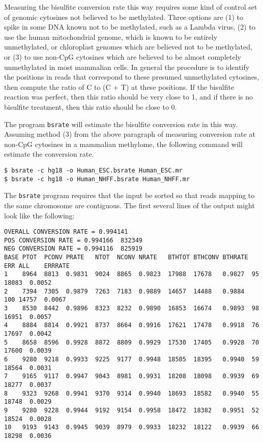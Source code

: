 \documentclass[10pt]{article}
\newcommand{\prog}[1]{\texttt{#1}}
\begin{document}
Measuring the bisulfite conversion rate this way requires some kind of
control set of genomic cytosines not believed to be methylated. Three
options are (1) to spike in some DNA known not to be methylated, such
as a Lambda virus, (2) to use the human mitochondrial genome, which
is known to be entirely unmethylated, or chloroplast genomes
which are believed not to be methylated, or (3) to use non-CpG cytosines
which are believed to be almost completely unmethylated in most
mammalian cells. In general the procedure is to identify the positions
in reads that correspond to these presumed unmethylated cytosines,
then compute the ratio of C to (C + T) at these positions. If the
bisulfite reaction was perfect, then this ratio should be very close
to 1, and if there is no bisulfite treatment, then this ratio should
be close to 0.

The program \prog{bsrate} will estimate the bisulfite conversion rate
in this way. Assuming method (3) from the above paragraph of measuring
conversion rate at non-CpG cytosines in a mammalian methylome, the
following command will estimate the conversion rate.
\begin{verbatim}
$ bsrate -c hg18 -o Human_ESC.bsrate Human_ESC.mr
$ bsrate -c hg18 -o Human_NHFF.bsrate Human_NHFF.mr
\end{verbatim}
The \prog{bsrate} program requires that the input be sorted so that
reads mapping to the same chromosome are contiguous. The first several
lines of the output might look like the following:
{\small{%
\begin{verbatim}
OVERALL CONVERSION RATE = 0.994141
POS CONVERSION RATE = 0.994166  832349
NEG CONVERSION RATE = 0.994116  825919
BASE PTOT  PCONV PRATE   NTOT  NCONV NRATE   BTHTOT BTHCONV BTHRATE ERR ALL    ERRRATE
1    8964  8813  0.9831  9024  8865  0.9823  17988  17678   0.9827  95  18083  0.0052
2    7394  7305  0.9879  7263  7183  0.9889  14657  14488   0.9884  100 14757  0.0067
3    8530  8442  0.9896  8323  8232  0.9890  16853  16674   0.9893  98  16951  0.0057
4    8884  8814  0.9921  8737  8664  0.9916  17621  17478   0.9918  76  17697  0.0042
5    8658  8596  0.9928  8872  8809  0.9929  17530  17405   0.9928  70  17600  0.0039
6    9280  9218  0.9933  9225  9177  0.9948  18505  18395   0.9940  59  18564  0.0031
7    9165  9117  0.9947  9043  8981  0.9931  18208  18098   0.9939  69  18277  0.0037
8    9323  9268  0.9941  9370  9314  0.9940  18693  18582   0.9940  55  18748  0.0029
9    9280  9228  0.9944  9192  9154  0.9958  18472  18382   0.9951  52  18524  0.0028
10   9193  9143  0.9945  9039  8979  0.9933  18232  18122   0.9939  66  18298  0.0036
\end{verbatim}%
}}
\end{document}
